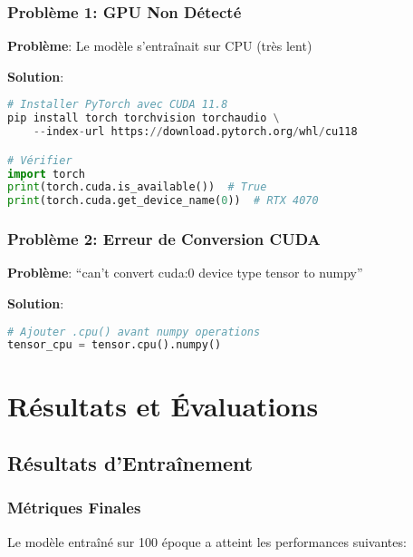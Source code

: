\documentclass[a4paper,12pt]{report}
\begin{document}
\subsection{Problème 1: GPU Non Détecté}

\textbf{Problème}: Le modèle s'entraînait sur CPU (très lent)

\textbf{Solution}:
\begin{lstlisting}[language=Python]
# Installer PyTorch avec CUDA 11.8
pip install torch torchvision torchaudio \
    --index-url https://download.pytorch.org/whl/cu118

# Vérifier
import torch
print(torch.cuda.is_available())  # True
print(torch.cuda.get_device_name(0))  # RTX 4070
\end{lstlisting}

\subsection{Problème 2: Erreur de Conversion CUDA}

\textbf{Problème}: ``can't convert cuda:0 device type tensor to numpy''

\textbf{Solution}:
\begin{lstlisting}[language=Python]
# Ajouter .cpu() avant numpy operations
tensor_cpu = tensor.cpu().numpy()
\end{lstlisting}

\chapter{Résultats et Évaluations}

\section{Résultats d'Entraînement}

\subsection{Métriques Finales}

Le modèle entraîné sur 100 époque a atteint les performances suivantes:
\end{document}
